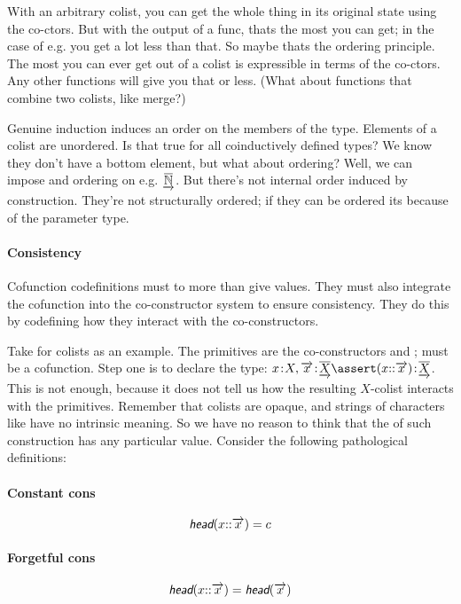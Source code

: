 \documentclass{article}
\begin{document}
With an arbitrary colist, you can get the whole thing in its original
state using the co-ctors. But with the output of a func, thats the
most you can get; in the case of e.g.  you get a lot less
than that. So maybe thats the ordering principle. The most you can
ever get out of a colist is expressible in terms of the co-ctors. Any
other functions will give you that or less. (What about functions that
combine two colists, like merge?)

Genuine induction induces an order on the members of the type.
Elements of a colist are unordered. Is that true for all coinductively
defined types? We know they don't have a bottom element, but what
about ordering? Well, we can impose and ordering on e.g.
\(\underrightarrow{\overline{\mathbb{N}}}\). But there's not internal order induced by
construction. They're not structurally ordered; if they can be ordered
its because of the parameter type.

\paragraph{Consistency}

Cofunction codefinitions must to more than give values. They must also
integrate the cofunction into the co-constructor system to ensure
consistency. They do this by codefining how they interact with the
co-constructors.

Take \Cons{} for colists as an example. The primitives are the
co-constructors \head{} and \tail{}; \cons{} must be a cofunction.
Step one is to declare the type: \(\tj{x}{X},
\tj{\coseq{x}}{\colist{X}}\lso \tj{(x\cons\coseq{x})}{\colist{X}}\).
This is not enough, because it does not tell us how the resulting
\(X\)-colist interacts with the primitives. Remember that colists are
opaque, and strings of characters like \cons have no intrinsic
meaning. So we have no reason to think that the \head of such
construction has any particular value. Consider the following
pathological definitions:

\paragraph{Constant cons}
\[\head(x\cons\coseq{x}) = c\]

\paragraph{Forgetful cons}
\[\head(x\cons\coseq{x}) = \head(\coseq{x})\]
\end{document}
